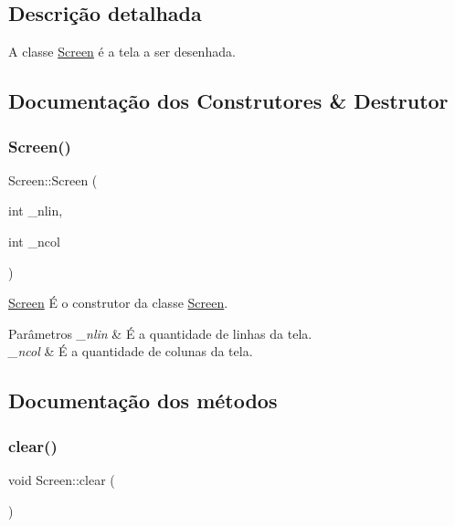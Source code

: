 \subsection{Descrição detalhada}
A classe \mbox{\hyperlink{class_screen}{Screen}} é a tela a ser desenhada. 

\subsection{Documentação dos Construtores \& Destrutor}
\mbox{\label{class_screen_a6c21beca43d25854d8674445127ef2eb}} 
\subsubsection{\texorpdfstring{Screen()}{Screen()}}
{\footnotesize\ttfamily Screen\+::\+Screen (\begin{DoxyParamCaption}\item[{int}]{\+\_\+nlin,  }\item[{int}]{\+\_\+ncol }\end{DoxyParamCaption})}



\mbox{\hyperlink{class_screen}{Screen}} É o construtor da classe \mbox{\hyperlink{class_screen}{Screen}}. 


\begin{DoxyParams}{Parâmetros}
{\em \+\_\+nlin} & É a quantidade de linhas da tela. \\
\hline
{\em \+\_\+ncol} & É a quantidade de colunas da tela. \\
\hline
\end{DoxyParams}


\subsection{Documentação dos métodos}
\mbox{\label{class_screen_a35e74266b2a04e37b354ceff7a5f1031}} 
\subsubsection{\texorpdfstring{clear()}{clear()}}
{\footnotesize\ttfamily void Screen\+::clear (\begin{DoxyParamCaption}{ }\end{DoxyParamCaption})}



